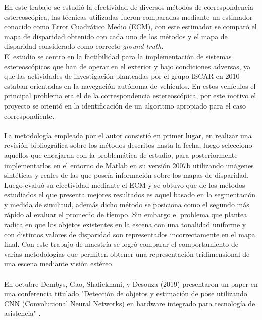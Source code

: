 En este trabajo se estudió la efectividad de diversos métodos de correspondencia estereoscópica, las técnicas utilizadas fueron comparadas mediante un estimador conocido como Error Cuadrático Medio (ECM), con este estimador se comparó el mapa de disparidad obtenido con cada uno de los métodos y el mapa de disparidad considerado como correcto \textit{ground-truth}. 
\\
El estudio se centro en la factibilidad para la implementación de sistemas estereoscópicos que han de operar en el exterior y bajo condiciones adversas, ya que las actividades de investigación planteadas por el grupo ISCAR en 2010 estaban orientadas en la navegación autónoma de vehículos. En estos vehículos el principal problema era el de la correspondencia estereoscópica, por este motivo el proyecto se orientó en la identificación de un algoritmo apropiado para el caso correspondiente.
\\
\\
La metodología empleada por el autor consistió en primer lugar, en realizar una revisión bibliográfica sobre los métodos descritos hasta la fecha, luego selecciono aquellos que encajaran con la problemática de estudio, para posteriormente implementarlos en el entorno de Matlab en su versión 2007b utilizando imágenes sintéticas y reales de las que poseía información sobre los mapas de disparidad. Luego evaluó su efectividad mediante el ECM y se obtuvo que de los métodos estudiados el que presenta mejores resultados es aquel basado en la segmentación y medida de similitud, además dicho método se posiciona como el segundo más rápido al evaluar el promedio de tiempo. Sin embargo el problema que plantea radica en que los objetos existentes en la escena con una tonalidad uniforme y con distintos valores de disparidad son representados incorrectamente en el mapa final. Con este trabajo de maestría se logró comparar el comportamiento de varias metodologías que permiten obtener una representación tridimensional de una escena mediante visión estéreo.
\\
\\
En octubre Dembys, Gao, Shafiekhani, y Desouza (2019) presentaron un paper en una conferencia titulado "Detección de objetos y estimación de pose utilizando CNN (Convolutional Neural Networks) en hardware integrado para tecnología de asistencia" \cite{AssistiveTech}.
\\
\\
